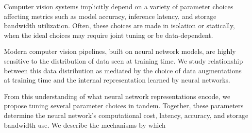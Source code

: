 Computer vision systems implicitly depend on a variety of parameter choices affecting metrics such as model accuracy, inference latency, and storage bandwidth utilization.
Often, these choices are made in isolation or statically, when the ideal choices may require joint tuning or be data-dependent.

Modern computer vision pipelines, built on neural network models, are highly sensitive to the distribution of data seen at training time.
We study relationship between this data distribution as mediated by the choice of data augmentations at training time and the internal representation learned by neural networks.

From this understanding of what neural network representations encode, we propose tuning several parameter choices in tandem.
Together, these parameters determine the neural network's computational cost, latency, accuracy, and storage bandwidth use.
We describe the mechanisms by which 
